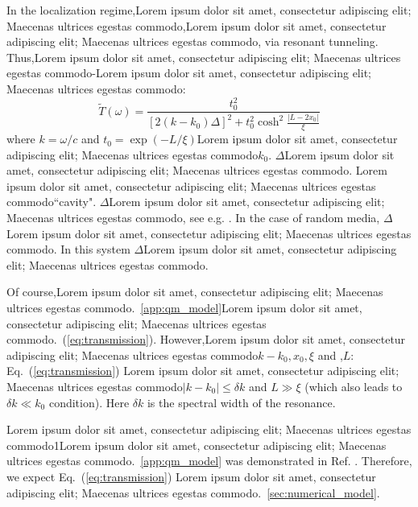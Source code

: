 In the localization regime,Lorem ipsum dolor sit amet, consectetur adipiscing elit; Maecenas ultrices egestas commodo,Lorem ipsum dolor sit amet, consectetur adipiscing elit; Maecenas ultrices egestas commodo, via resonant tunneling. Thus,Lorem ipsum dolor sit amet, consectetur adipiscing elit; Maecenas ultrices egestas commodo-Lorem ipsum dolor sit amet, consectetur adipiscing elit; Maecenas ultrices egestas commodo:
\begin{equation}
\tilde{T}(\omega) = \frac{t_0^2}{\left[2(k-k_0)\Delta\right]^2+t_0^2\cosh^2\displaystyle\frac{\left|L-2x_0\right|}{\xi} }
\label{eq:transmission}
\end{equation}
where $k=\omega/c$ and $t_0=\exp(-L/\xi)$Lorem ipsum dolor sit amet, consectetur adipiscing elit; Maecenas ultrices egestas commodo$k_0$. $\Delta$Lorem ipsum dolor sit amet, consectetur adipiscing elit; Maecenas ultrices egestas commodo. Lorem ipsum dolor sit amet, consectetur adipiscing elit; Maecenas ultrices egestas commodo``cavity"\cite{2008_Bliokh}. $\Delta$Lorem ipsum dolor sit amet, consectetur adipiscing elit; Maecenas ultrices egestas commodo, see e.g. \cite{1994_Pendry,2001_Deych_mqw}. In the case of random media, $\Delta$Lorem ipsum dolor sit amet, consectetur adipiscing elit; Maecenas ultrices egestas commodo. In this system $\Delta$Lorem ipsum dolor sit amet, consectetur adipiscing elit; Maecenas ultrices egestas commodo\cite{2004_Bliokh_wavelet}.

Of course,Lorem ipsum dolor sit amet, consectetur adipiscing elit; Maecenas ultrices egestas commodo.~\ref{app:qm_model}Lorem ipsum dolor sit amet, consectetur adipiscing elit; Maecenas ultrices egestas commodo.~(\ref{eq:transmission}). However,Lorem ipsum dolor sit amet, consectetur adipiscing elit; Maecenas ultrices egestas commodo$k-k_0,x_0,\xi$ and ,$L$: Eq.~(\ref{eq:transmission}) Lorem ipsum dolor sit amet, consectetur adipiscing elit; Maecenas ultrices egestas commodo$\left|k-k_0\right|\leq\delta k$ and $L\gg\xi$ (which also leads to $\delta k\ll k_0$ condition). Here $\delta k$ is the spectral width of the resonance.

Lorem ipsum dolor sit amet, consectetur adipiscing elit; Maecenas ultrices egestas commodo1Lorem ipsum dolor sit amet, consectetur adipiscing elit; Maecenas ultrices egestas commodo.~\ref{app:qm_model} was demonstrated in Ref. \cite{2004_Bliokh_wavelet}. Therefore, we expect Eq.~(\ref{eq:transmission}) Lorem ipsum dolor sit amet, consectetur adipiscing elit; Maecenas ultrices egestas commodo.~\ref{sec:numerical_model}.

